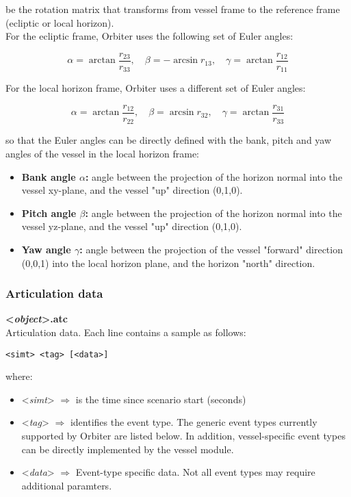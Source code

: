 \documentclass[Orbiter Technical Reference.tex]{subfiles}
\begin{document}
\noindent
be the rotation matrix that transforms from vessel frame to the reference frame (ecliptic or local horizon).\\
For the ecliptic frame, Orbiter uses the following set of Euler angles:

\[ \alpha = \arctan\frac{r_{23}}{r_{33}}, \quad \beta = -\arcsin r_{13}, \quad \gamma = \arctan\frac{r_{12}}{r_{11}} \]

\noindent
For the local horizon frame, Orbiter uses a different set of Euler angles:

\[ \alpha = \arctan\frac{r_{12}}{r_{22}}, \quad \beta = \arcsin r_{32}, \quad \gamma = \arctan\frac{r_{31}}{r_{33}} \]

\noindent
so that the Euler angles can be directly defined with the bank, pitch and yaw angles of the vessel in the local horizon frame:

\begin{itemize}
\item \textbf{Bank angle $\alpha$:} angle between the projection of the horizon normal into the vessel xy-plane, and the vessel "up" direction (0,1,0).
\item \textbf{Pitch angle $\beta$:} angle between the projection of the horizon normal into the vessel yz-plane, and the vessel "up" direction (0,1,0).
\item \textbf{Yaw angle $\gamma$:} angle between the projection of the vessel "forward" direction (0,0,1) into the local horizon plane, and the horizon "north" direction.
\end{itemize}

 
\subsubsection{Articulation data}
\textbf{<\textit{object}>.atc}\\
Articulation data. Each line contains a sample as follows:

\begin{lstlisting}[language=OSFS]
<simt> <tag> [<data>]
\end{lstlisting}

\noindent
where:

\begin{itemize}
\item <\textit{simt}> $\Rightarrow$ is the time since scenario start (seconds)
\item <\textit{tag}> $\Rightarrow$ identifies the event type. The generic event types currently supported by Orbiter are listed below. In addition, vessel-specific event types can be directly implemented by the vessel module.
\item <\textit{data}> $\Rightarrow$ Event-type specific data. Not all event types may require additional paramters.
\end{itemize}
\end{document}
